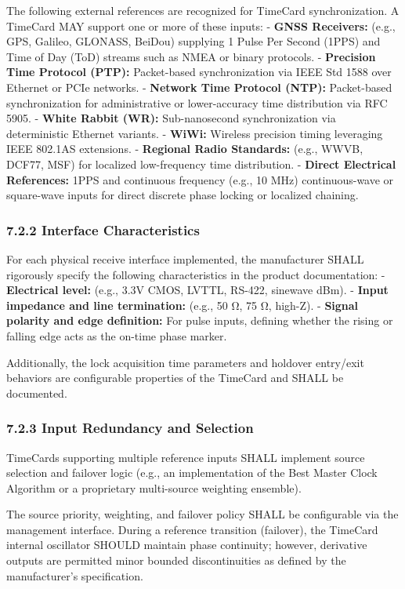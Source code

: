 The following external references are recognized for TimeCard
synchronization. A TimeCard MAY support one or more of these inputs: -
\textbf{GNSS Receivers:} (e.g., GPS, Galileo, GLONASS, BeiDou) supplying
1 Pulse Per Second (1PPS) and Time of Day (ToD) streams such as NMEA or
binary protocols. - \textbf{Precision Time Protocol (PTP):} Packet-based
synchronization via IEEE Std 1588 over Ethernet or PCIe networks. -
\textbf{Network Time Protocol (NTP):} Packet-based synchronization for
administrative or lower-accuracy time distribution via RFC 5905. -
\textbf{White Rabbit (WR):} Sub-nanosecond synchronization via
deterministic Ethernet variants. - \textbf{WiWi:} Wireless precision
timing leveraging IEEE 802.1AS extensions. - \textbf{Regional Radio
Standards:} (e.g., WWVB, DCF77, MSF) for localized low-frequency time
distribution. - \textbf{Direct Electrical References:} 1PPS and
continuous frequency (e.g., 10 MHz) continuous-wave or square-wave
inputs for direct discrete phase locking or localized chaining.

\subsubsection{7.2.2 Interface
Characteristics}\label{interface-characteristics}

For each physical receive interface implemented, the manufacturer SHALL
rigorously specify the following characteristics in the product
documentation: - \textbf{Electrical level:} (e.g., 3.3V CMOS, LVTTL,
RS-422, sinewave dBm). - \textbf{Input impedance and line termination:}
(e.g., 50 Ω, 75 Ω, high-Z). - \textbf{Signal polarity and edge
definition:} For pulse inputs, defining whether the rising or falling
edge acts as the on-time phase marker.

Additionally, the lock acquisition time parameters and holdover
entry/exit behaviors are configurable properties of the TimeCard and
SHALL be documented.

\subsubsection{7.2.3 Input Redundancy and
Selection}\label{input-redundancy-and-selection}

TimeCards supporting multiple reference inputs SHALL implement source
selection and failover logic (e.g., an implementation of the Best Master
Clock Algorithm or a proprietary multi-source weighting ensemble).

The source priority, weighting, and failover policy SHALL be
configurable via the management interface. During a reference transition
(failover), the TimeCard internal oscillator SHOULD maintain phase
continuity; however, derivative outputs are permitted minor bounded
discontinuities as defined by the manufacturer's specification.

